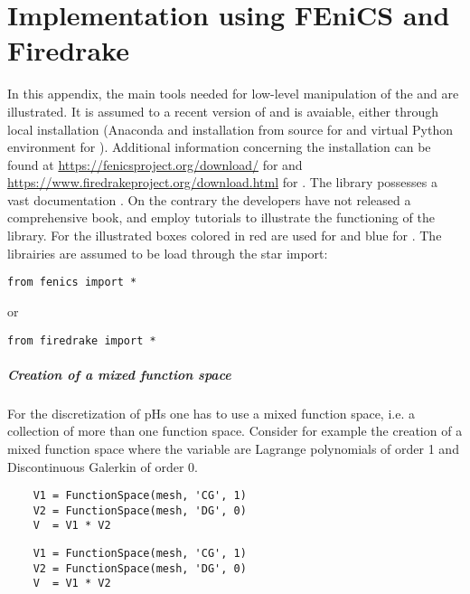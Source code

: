 \chapter{Implementation using FEniCS and Firedrake}

In this appendix, the main tools needed for low-level manipulation of the {} and {} are illustrated. It is assumed to a recent version of {} and {} is avaiable, either through local installation (Anaconda and installation from source for {} and virtual Python environment for {}). Additional information concerning the installation can be found at \url{https://fenicsproject.org/download/} for {} and \url{https://www.firedrakeproject.org/download.html} for {}. The {} library possesses a vast documentation \cite{logg2012}. On the contrary the {} developers have not released a comprehensive book, and employ tutorials to illustrate the functioning of the library. For the illustrated boxes colored in red are used for \textcolor{red}{{}} and blue for \textcolor{blue}{{}}. The librairies are assumed to be load through the star import:	
\begin{verbatim}
from fenics import *
\end{verbatim}
or
\begin{verbatim}
from firedrake import *
\end{verbatim}
\paragraph{Creation of a mixed function space}
For the discretization of pHs one has to use a mixed function space, i.e. a collection of more than one function space. Consider for example the creation of a mixed function space where the variable are Lagrange polynomials of order 1 and Discontinuous Galerkin of order 0.
\begin{tcolorbox}[breakable, size=fbox, boxrule=1pt, pad at break*=1mm, colframe=red, enlarge top by=0.25em, enlarge bottom by=0.5em]
	\begin{verbatim}
	V1 = FunctionSpace(mesh, 'CG', 1)
	V2 = FunctionSpace(mesh, 'DG', 0)
	V  = V1 * V2
	\end{verbatim}
\end{tcolorbox}
\begin{tcolorbox}[breakable, size=fbox, boxrule=1pt, pad at break*=1mm, colframe=blue, enlarge top by=0.25em, enlarge bottom by=0.5em]
	\begin{verbatim}
	V1 = FunctionSpace(mesh, 'CG', 1)
	V2 = FunctionSpace(mesh, 'DG', 0)
	V  = V1 * V2
	\end{verbatim}
\end{tcolorbox}
